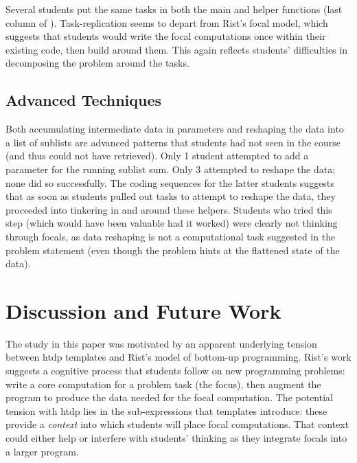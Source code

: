 \documentclass{sig-alternate-05-2015}
\newcommand{\htdp}{{\sc htdp}\xspace}
\begin{document}
Several students put the same tasks in both the main and helper functions (last column of ). Task-replication seems to depart from Rist's focal model, which suggests that students would write the focal computations once within their existing code, then build around them. This again reflects students' difficulties in decomposing the problem around the tasks.


\subsection{Advanced Techniques}

Both accumulating intermediate data in parameters and reshaping the data into a list of sublists are advanced patterns that students had not seen in the course (and thus could not have retrieved).  Only 1 student attempted to add a parameter for the running sublist sum.  Only 3 attempted to reshape the data; none did so successfully.  The coding sequences for the latter students suggests that as soon as students pulled out tasks to attempt to reshape the data, they proceeded into tinkering in and around these helpers.  
Students who tried this step (which would have been valuable had it worked) were clearly not thinking through focals, as data reshaping is not a computational task suggested in the problem statement (even though the problem hints at the flattened state of the data).

\section{Discussion and Future Work}
\label{sec:discuss}

The study in this paper was motivated by an apparent underlying tension between \htdp templates and Rist's model of bottom-up programming.  Rist's work suggests a cognitive process that students follow on new programming problems: write a core computation for a problem task (the focus), then augment the program to produce the data needed for the focal computation.  The potential tension with \htdp lies in the sub-expressions that templates introduce: these provide a \textit{context} into which students will place focal computations.  That context could either help or interfere with students' thinking as they integrate focals into a larger program. 
\end{document}
